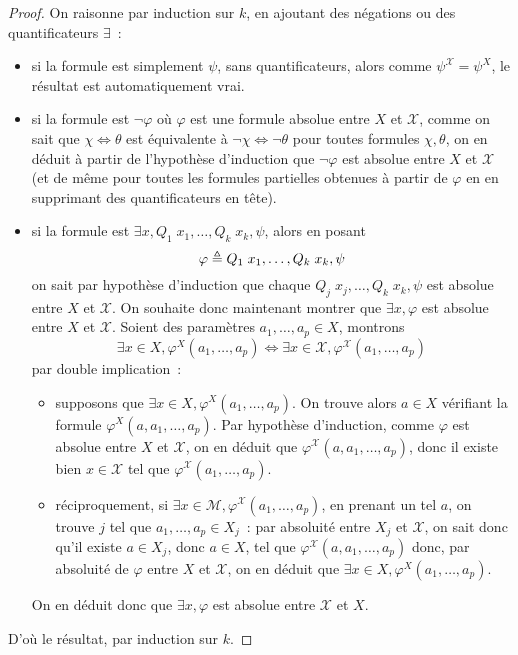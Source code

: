 \begin{proof}
  On raisonne par induction sur $k$, en ajoutant des négations ou des
  quantificateurs $\exists$~:
  \begin{itemize}
  \item si la formule est simplement $\psi$, sans quantificateurs, alors comme
    $\psi^\mathcal X = \psi^X$, le résultat est automatiquement vrai.
  \item si la formule est $\lnot \varphi$ où $\varphi$ est une formule absolue
    entre $X$ et $\mathcal X$, comme on sait que $\chi \iff \theta$ est
    équivalente à $\lnot\chi \iff \lnot \theta$ pour toutes formules
    $\chi,\theta$, on en déduit à partir de l'hypothèse d'induction que
    $\lnot \varphi$ est absolue entre $X$ et $\mathcal X$ (et de même pour
    toutes les formules partielles obtenues à partir de $\varphi$ en en
    supprimant des quantificateurs en tête).
  \item si la formule est $\exists x, Q_1\;x_1,\ldots,Q_k\;x_k,\psi$, alors
    en posant
    \[\varphi \triangleq Q_1\;x_1,\ldots,Q_k\;x_k, \psi\]
    on sait par hypothèse d'induction que chaque
    $Q_j\;x_j,\ldots,Q_k\;x_k,\psi$ est absolue entre $X$ et $\mathcal X$.
    On souhaite donc maintenant montrer que $\exists x, \varphi$ est absolue
    entre $X$ et $\mathcal X$. Soient des paramètres $a_1,\ldots,a_p \in X$,
    montrons
    \[\exists x\in X, \varphi^X(a_1,\ldots,a_p)
    \iff \exists x \in \mathcal X, \varphi^\mathcal X(a_1,\ldots,a_p)\]
    par double implication~:
    \begin{itemize}
    \item supposons que $\exists x \in X,\varphi^X(a_1,\ldots,a_p)$.
      On trouve alors $a \in X$ vérifiant la formule
      $\varphi^X(a,a_1,\ldots,a_p)$. Par hypothèse d'induction, comme $\varphi$
      est absolue entre $X$ et $\mathcal X$, on en déduit que
      $\varphi^\mathcal X(a,a_1,\ldots,a_p)$, donc il existe bien
      $x \in \mathcal X$ tel que $\varphi^\mathcal X(a_1,\ldots,a_p)$.
    \item réciproquement, si
      $\exists x\in\mathcal M, \varphi^\mathcal X(a_1,\ldots,a_p)$,
      en prenant un tel $a$, on trouve $j$ tel que $a_1,\ldots,a_p \in X_j$~:
      par absoluité entre $X_j$ et $\mathcal X$, on sait donc qu'il existe
      $a \in X_j$, donc $a \in X$, tel que $\varphi^\mathcal X(a,a_1,\ldots,a_p)$
      donc, par absoluité de $\varphi$ entre $X$ et $\mathcal X$, on en déduit
      que $\exists x \in X, \varphi^X(a_1,\ldots,a_p)$.
    \end{itemize}
    On en déduit donc que $\exists x, \varphi$ est absolue entre $\mathcal X$
    et $X$.
  \end{itemize}
  D'où le résultat, par induction sur $k$.
\end{proof}


